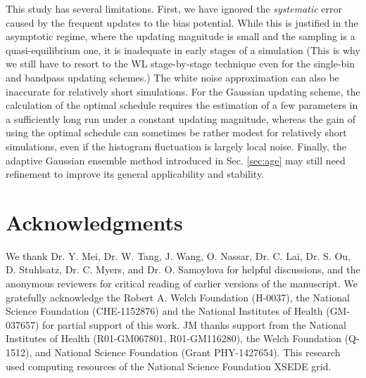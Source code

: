 \documentclass[reprint, superscriptaddress, floatfix]{revtex4-1}
\begin{document}
This study has several limitations.
%
First, we have ignored the \emph{systematic}
error\cite{zhou2005, morozov2007, zhou2008}
caused by the frequent updates to the bias potential.
%
While this is justified in the asymptotic regime,
where the updating magnitude is small
and the sampling is a quasi-equilibrium one,\cite{
  zhou2005, morozov2007, zhou2008, barducci2008, dama2014}
it is inadequate in
early stages of a simulation
(This is why we still have to resort to the WL stage-by-stage
technique even for the single-bin and bandpass updating schemes.)
%
The white noise approximation
can also be inaccurate for relatively short simulations.
%
For the Gaussian updating scheme,
the calculation of the optimal schedule requires
the estimation of a few parameters
in a sufficiently long run
under a constant updating magnitude,
whereas the gain of using the optimal schedule
can sometimes be rather modest
for relatively short simulations,
even if the histogram fluctuation is largely
local noise.
%
Finally, the adaptive Gaussian ensemble method
introduced in Sec. \ref{sec:age} may still need refinement
to improve its general applicability and stability.


\section{Acknowledgments}

We thank Dr. Y. Mei, Dr. W. Tang, J. Wang,
O. Nassar, Dr. C. Lai, Dr. S. Ou, D. Stuhlsatz,
Dr. C. Myers, and Dr. O. Samoylova
for helpful discussions,
and the anonymous reviewers for critical reading
of earlier versions of the manuscript.
%
We gratefully acknowledge the Robert A. Welch Foundation (H-0037),
the National Science Foundation (CHE-1152876)
and the National Institutes of Health (GM-037657)
for partial support of this work.
%
JM thanks support from the National Institutes of Health
(R01-GM067801, R01-GM116280),
the Welch Foundation (Q-1512),
and National Science Foundation (Grant PHY-1427654).
%
This research used computing resources of
the National Science Foundation XSEDE grid.
%
\end{document}
